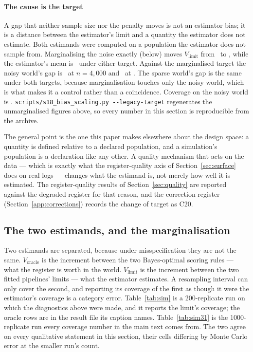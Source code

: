 \paragraph{The cause is the target}
A gap that neither sample size nor the penalty moves is not an estimator
bias; it is a distance between the estimator's limit and a quantity the
estimator does not estimate. Both estimands were computed on a population the
estimator does not sample from. Marginalising the noise exactly (below) moves
$V_{\mathrm{limit}}$ from \limitNoisyBefore\ to \limitNoisyAfter, while the
estimator's mean is \meanNoisyEstimate\ under either target. Against the
marginalised target the noisy world's gap is \noisyGapFixed\ at
$n = 4{,}000$ and \noisyGapFixedLarge\ at \sizeHi. The sparse world's gap is
the same under both targets, because marginalisation touches only the noisy
world, which is what makes it a control rather than a coincidence. Coverage
on the noisy world is \coverageNoisyAfter.
\texttt{scripts/s18\_bias\_scaling.py -{}-legacy-target} regenerates the
unmarginalised figures above, so every number in this section is
reproducible from the archive.

The general point is the one this paper makes elsewhere about the design
space: a quantity is defined relative to a declared population, and a
simulation's population is a declaration like any other. A quality mechanism
that acts on the data --- which is exactly what the register-quality axis of
Section~\ref{sec:surface} does on real logs --- changes what the estimand is,
not merely how well it is estimated. The register-quality results of
Section~\ref{sec:quality} are reported against the degraded register for that
reason, and the correction register (Section~\ref{app:corrections}) records
the change of target as C20.

\subsection*{The two estimands, and the marginalisation}

Two estimands are separated, because under misspecification they are not the
same. $V_{\mathrm{oracle}}$ is the increment between the two Bayes-optimal
scoring rules --- what the register is worth in the world.
$V_{\mathrm{limit}}$ is the increment between the two fitted pipelines'
limits --- what the estimator estimates. A resampling interval can only cover
the second, and reporting its coverage of the first as though it were the
estimator's coverage is a category error. Table~\ref{tab:sim} is a
200-replicate run on which the diagnostics above were made, and it reports
the limit's coverage; the oracle rows are in the result file its caption
names. Table~\ref{tab:sim31} is the 1000-replicate run every coverage number
in the main text comes from. The two agree on every qualitative statement in
this section, their cells differing by Monte Carlo error at the smaller run's
count.

